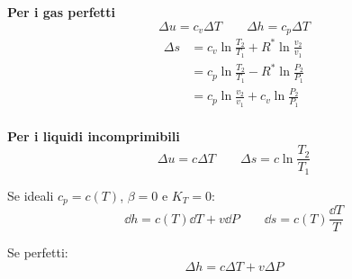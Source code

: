 \textbf{Per i gas perfetti}
\[ \Delta u = c_v \Delta T \qquad \Delta h = c_p \Delta T \]
\begin{align*}
    \Delta s &= c_v \ln{\frac{T_2}{T_1}} + R^*\ln{\frac{v_2}{v_1}} \\
    &= c_p \ln{\frac{T_2}{T_1}} - R^*\ln{\frac{P_2}{P_1}} \\
    &= c_p \ln{\frac{v_2}{v_1}} + c_v\ln{\frac{P_2}{P_1}} \\
\end{align*}

\textbf{Per i liquidi incomprimibili}
\[ \Delta u = c \Delta T \qquad \Delta s = c \ln{\frac{T_2}{T_1}} \]

Se ideali $c_p = c(T)$, $\beta = 0$ e $K_T = 0$:
\[ \dd{h} = c(T)\dd{T} + v\dd{P} \qquad \dd{s} = c(T)\frac{\dd{T}}{T} \]

Se perfetti:
\[ \Delta h = c\Delta T + v \Delta P \]

